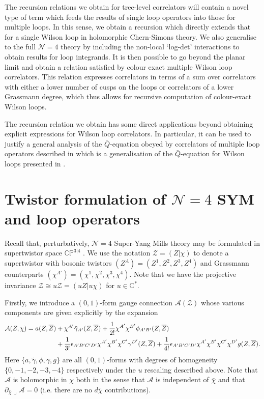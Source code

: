 \documentclass[12pt]{article}
\numberwithin{equation}{section}
\begin{document}
The recursion relations we obtain for tree-level correlators will contain a novel type of term which feeds the results of single loop operators into those for multiple loops. In this sense, we obtain a recursion which directly extends that for a single Wilson loop in holomorphic Chern-Simons theory. We also generalise to the full $\mathcal{N}=4$ theory by including the non-local `log-det' interactions to obtain results for loop integrands. It is then possible to go beyond the planar limit and obtain a relation satisfied by colour exact multiple Wilson loop correlators. This relation expresses correlators in terms of a sum over correlators with either a lower number of cusps on the loops or correlators of a lower Grassmann degree, which thus allows for recursive computation of colour-exact Wilson loops.

The recursion relation we obtain has some direct applications beyond obtaining explicit expressions for Wilson loop correlators. In particular, it can be used to justify a general analysis of the $\bar{Q}$-equation obeyed by correlators of multiple loop operators described in \cite{Drummond:2025ulh,Drummond:2026lvq} which is a generalisation of the $\bar{Q}$-equation for Wilson loops presented in \cite{Caron-Huot:2011dec,Bullimore:2011kg}.

\section{Twistor formulation of \texorpdfstring{$\mathcal{N}=4$}{N=4} SYM and loop operators}

Recall that, perturbatively, \(\mathcal{N}=4\) Super-Yang Mills theory may be formulated in supertwistor space $\mathbb{CP}^{3|4}$ \cite{Boels:2006ir}. We use the notation $\mathcal{Z} = (Z|\chi)$ to denote a supertwistor with bosonic twistors $(Z^A)= (Z^1,Z^2,Z^3,Z^4)$ and Grassmann counterparts $(\chi^{A'}) = (\chi^1,\chi^2,\chi^3,\chi^4)$. Note that we have the projective invariance $\mathcal{Z} \cong u \mathcal{Z} = (u Z | u \chi)$ for $u \in \mathbb{C}^*$.

Firstly, we introduce a $(0,1)$-form gauge connection $\mathcal{A}(\mathcal{Z})$ whose various components are given explicitly by the expansion
\begin{align}
\label{superA}
\mathcal{A}(Z,\chi) = a(Z,\overline{Z}) &+ \chi^{A'} \tilde{\gamma}_{A'}(Z,\overline{Z}) + \frac{1}{2!}\chi^{A'}\chi^{B'} \phi_{A'B'}(Z,\overline{Z}) \\
&+ \frac{1}{3!}\epsilon_{A'B'C'D'}\chi^{A'}\chi^{B'}\chi^{C'}
\gamma^{D'}(Z,\overline{Z}) + \frac{1}{4!}\epsilon_{A'B'C'D'}\chi^{A'}\chi^{B'}\chi^{C'}\chi^{D'} g(Z,\overline{Z}). \notag 
\end{align}
Here $\{a,\tilde{\gamma},\phi,\gamma,g\}$ are all $(0,1)$-forms with degrees of homogeneity $\{0,-1,-2,-3,-4\}$ respectively under the $u$ rescaling described above. Note that $\mathcal{A}$ is holomorphic in $\chi$ both in the sense that $\mathcal{A}$ is independent of $\bar{\chi}$ and that $\partial_{\bar{\chi}} \lrcorner \mathcal{A} =0$ (i.e. there are no $d \bar\chi$ contributions).
\end{document}
